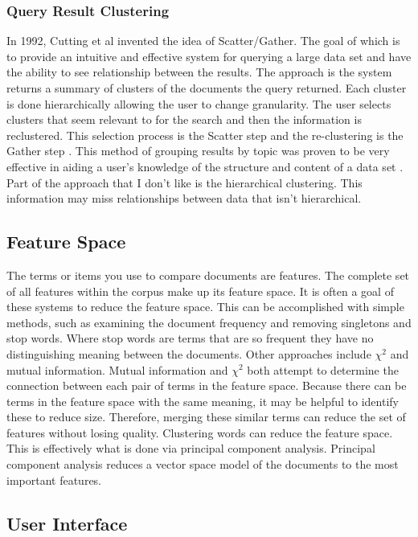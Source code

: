 \documentclass[11pt]{article}
\begin{document}
\subsubsection{Query Result Clustering}

In 1992, Cutting et al invented the idea of Scatter/Gather.
The goal of which is to provide an intuitive and effective system for querying a large data set and have the ability to see relationship between the results.
The approach is the system returns a summary of clusters of the documents the query returned.
Each cluster is done hierarchically allowing the user to change granularity.
The user selects clusters that seem relevant to for the search and then the information is reclustered.
This selection process is the Scatter step and the re-clustering is the Gather step \cite{Cutting92}.
This method of grouping results by topic was proven to be very effective in aiding a user's knowledge of the structure and content of a data set \cite{Pirolli96}.
Part of the approach that I don't like is the hierarchical clustering.
This information may miss relationships between data that isn't hierarchical.

\subsection{Feature Space}

The terms or items you use to compare documents are features.
The complete set of all features within the corpus make up its feature space.
It is often a goal of these systems to reduce the feature space.
This can be accomplished with simple methods, such as examining the document frequency and removing singletons and stop words.
Where stop words are terms that are so frequent they have no distinguishing meaning between the documents.
Other approaches include $\chi^2$ and mutual information.
Mutual information and $\chi^2$ both attempt to determine the connection between each pair of terms in the feature space.
Because there can be terms in the feature space with the same meaning, it may be helpful to identify these to reduce size.
Therefore, merging these similar terms can reduce the set of features without losing quality.
Clustering words can reduce the feature space.
This is effectively what is done via principal component analysis.
Principal component analysis reduces a vector space model of the documents to the most important features.

\subsection{User Interface}
\end{document}
